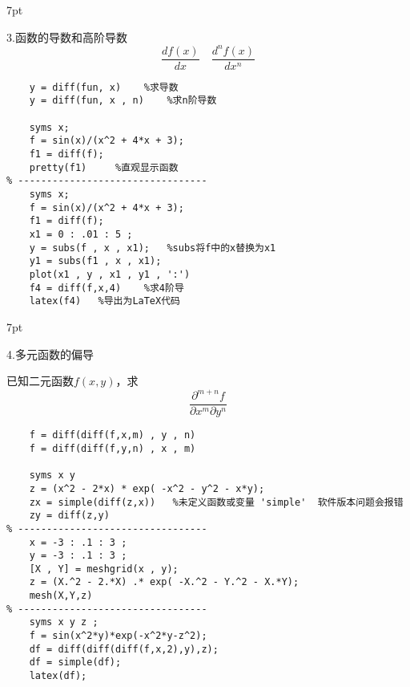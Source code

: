\documentclass{article} %
\newenvironment{eg}{%
\def\FrameCommand{%
\hspace{1pt}%
{\color{Gray}\vrule width 2pt}%
{\color{egshade}\vrule width 4pt}%
\colorbox{egshade}%
}%
\MakeFramed{\advance\hsize-\width\FrameRestore}%
\noindent\hspace{-4.55pt}%
\begin{adjustwidth}{}{7pt}%
\vspace{2pt}\vspace{2pt}%
\normalfont %
}
{%
\vspace{2pt}\end{adjustwidth}\endMakeFramed%
}
\begin{document}
\begin{eg}
    3.函数的导数和高阶导数
    $$\frac{df(x)}{dx} \quad \frac{d^{n}f(x)}{dx^{n}}$$
\end{eg}
\begin{lstlisting}
    y = diff(fun, x)    %求导数
    y = diff(fun, x , n)    %求n阶导数

    syms x;
    f = sin(x)/(x^2 + 4*x + 3);
    f1 = diff(f);
    pretty(f1)     %直观显示函数
% ---------------------------------
    syms x;
    f = sin(x)/(x^2 + 4*x + 3);
    f1 = diff(f);
    x1 = 0 : .01 : 5 ;
    y = subs(f , x , x1);   %subs将f中的x替换为x1
    y1 = subs(f1 , x , x1);
    plot(x1 , y , x1 , y1 , ':')
    f4 = diff(f,x,4)    %求4阶导
    latex(f4)   %导出为LaTeX代码
\end{lstlisting}

\begin{eg}
    4.多元函数的偏导

    已知二元函数$f(x,y)$，求
    $$\frac{\partial ^{m+n}f}{\partial x^{m} \partial y^{n}}$$
\end{eg}
\begin{lstlisting}
    f = diff(diff(f,x,m) , y , n)
    f = diff(diff(f,y,n) , x , m)

    syms x y
    z = (x^2 - 2*x) * exp( -x^2 - y^2 - x*y);
    zx = simple(diff(z,x))   %未定义函数或变量 'simple'  软件版本问题会报错
    zy = diff(z,y)
% ---------------------------------
    x = -3 : .1 : 3 ;
    y = -3 : .1 : 3 ;
    [X , Y] = meshgrid(x , y);
    z = (X.^2 - 2.*X) .* exp( -X.^2 - Y.^2 - X.*Y);
    mesh(X,Y,z)
% ---------------------------------
    syms x y z ;
    f = sin(x^2*y)*exp(-x^2*y-z^2);
    df = diff(diff(diff(f,x,2),y),z);
    df = simple(df);
    latex(df);
\end{lstlisting}
\end{document}
